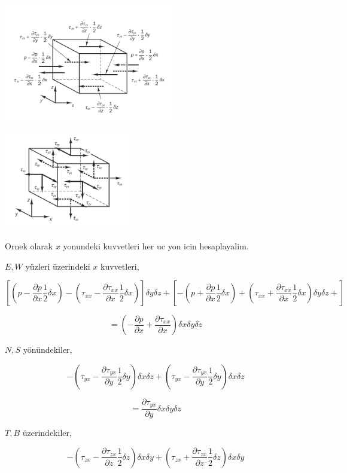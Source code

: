 \documentclass[12pt,fleqn]{article}\usepackage{../../common}
\begin{document}
\includegraphics[width=20em]{phy_030_fluid2_01.png}

\includegraphics[width=15em]{phy_030_fluid2_02.png}


Ornek olarak $x$ yonundeki kuvvetleri her uc yon icin hesaplayalim.

$E,W$ yüzleri üzerindeki $x$ kuvvetleri, 

$$
\left[
  \left( p - \frac{\partial p}{\partial x} \frac{1}{2} \delta x \right) -
  \left( \tau_{xx} - \frac{\partial \tau_{xx}}{\partial x} \frac{1}{2} \delta x \right) 
\right]
  \delta y \delta z  +
\left[
  -\left( p + \frac{\partial p}{\partial x} \frac{1}{2} \delta x \right) +
  \left( \tau_{xx} + \frac{\partial \tau_{xx}}{\partial x} \frac{1}{2} \delta x \right) 
  \delta y \delta z  +  
\right]
$$

$$
= \left(
-\frac{\partial p}{\partial x} + \frac{\partial \tau_{xx}}{\partial x}
\right)
\delta x \delta y \delta z
$$

$N,S$ yönündekiler,

$$
- \left( \tau_{yx} - \frac{\partial \tau_{yx}}{\partial y}  \frac{1}{2} \delta y
\right) \delta x \delta z  +
\left( \tau_{yx} - \frac{\partial \tau_{yx}}{\partial y}  \frac{1}{2} \delta y
\right) \delta x \delta z  
$$

$$
= \frac{\partial \tau_{yx}}{\partial y} \delta x \delta y \delta z 
$$

$T,B$ üzerindekiler,

$$
- \left(
\tau_{zx} - \frac{\partial \tau_{zx}}{\partial z} \frac{1}{2} \delta z
\right) \delta x \delta y +
\left(
\tau_{zx} + \frac{\partial \tau_{zx}}{\partial z} \frac{1}{2} \delta z
\right) \delta x \delta y 
$$
\end{document}
